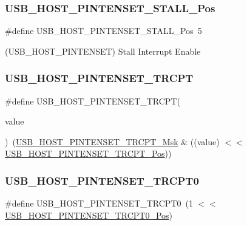 \subsubsection{\texorpdfstring{USB\_HOST\_PINTENSET\_STALL\_Pos}{USB\_HOST\_PINTENSET\_STALL\_Pos}}
{\footnotesize\ttfamily \#define U\+S\+B\+\_\+\+H\+O\+S\+T\+\_\+\+P\+I\+N\+T\+E\+N\+S\+E\+T\+\_\+\+S\+T\+A\+L\+L\+\_\+\+Pos~5}



(U\+S\+B\+\_\+\+H\+O\+S\+T\+\_\+\+P\+I\+N\+T\+E\+N\+S\+ET) Stall Interrupt Enable 

\mbox{\label{group___s_a_m_d21___u_s_b_gaf76c5a96981b5f0062e41ec7667f31a6}} 
\subsubsection{\texorpdfstring{USB\_HOST\_PINTENSET\_TRCPT}{USB\_HOST\_PINTENSET\_TRCPT}}
{\footnotesize\ttfamily \#define U\+S\+B\+\_\+\+H\+O\+S\+T\+\_\+\+P\+I\+N\+T\+E\+N\+S\+E\+T\+\_\+\+T\+R\+C\+PT(\begin{DoxyParamCaption}\item[{}]{value }\end{DoxyParamCaption})~(\mbox{\hyperlink{group___s_a_m_d21___u_s_b_ga3f24e78627191f53e36e8784bd418f0b}{U\+S\+B\+\_\+\+H\+O\+S\+T\+\_\+\+P\+I\+N\+T\+E\+N\+S\+E\+T\+\_\+\+T\+R\+C\+P\+T\+\_\+\+Msk}} \& ((value) $<$$<$ \mbox{\hyperlink{group___s_a_m_d21___u_s_b_gaa8d9cbab5a85407960e0d987baa97e88}{U\+S\+B\+\_\+\+H\+O\+S\+T\+\_\+\+P\+I\+N\+T\+E\+N\+S\+E\+T\+\_\+\+T\+R\+C\+P\+T\+\_\+\+Pos}}))}

\mbox{\label{group___s_a_m_d21___u_s_b_ga242d35e07e6395f6086704468a22d0c0}} 
\subsubsection{\texorpdfstring{USB\_HOST\_PINTENSET\_TRCPT0}{USB\_HOST\_PINTENSET\_TRCPT0}}
{\footnotesize\ttfamily \#define U\+S\+B\+\_\+\+H\+O\+S\+T\+\_\+\+P\+I\+N\+T\+E\+N\+S\+E\+T\+\_\+\+T\+R\+C\+P\+T0~(1 $<$$<$ \mbox{\hyperlink{group___s_a_m_d21___u_s_b_ga4b7651b4e3d83869c6c045765079992f}{U\+S\+B\+\_\+\+H\+O\+S\+T\+\_\+\+P\+I\+N\+T\+E\+N\+S\+E\+T\+\_\+\+T\+R\+C\+P\+T0\+\_\+\+Pos}})}

